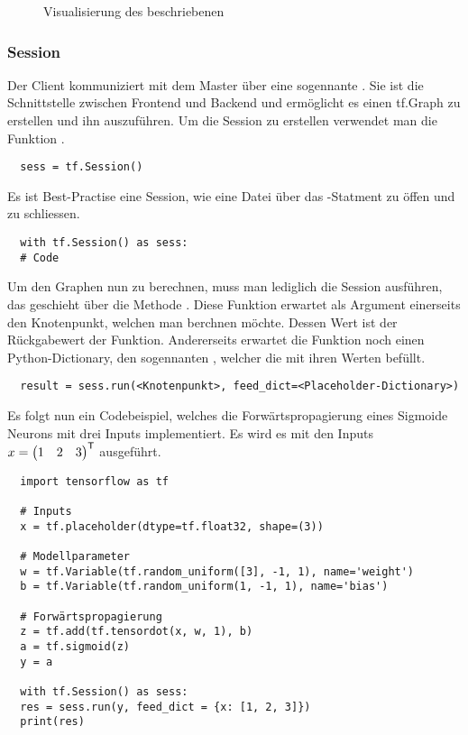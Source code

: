 \begin{figure}
  \caption{Visualisierung des beschriebenen }
\end{figure}
\para{}


\subsubsection{Session}
Der Client kommuniziert mit dem Master über eine sogennante
.
Sie ist die Schnittstelle zwischen Frontend und Backend und ermöglicht es einen tf.Graph
zu erstellen und ihn auszuführen.
Um die Session zu erstellen verwendet man die Funktion .
\begin{verbatim}
  sess = tf.Session()
\end{verbatim}
Es ist Best-Practise eine Session, wie eine Datei über das
-Statment zu öffen und zu schliessen.
\begin{verbatim}
  with tf.Session() as sess:
  # Code
\end{verbatim}
\para{}
Um den Graphen nun zu berechnen, muss man lediglich die Session ausführen, das
geschieht über die Methode .
Diese Funktion erwartet als Argument einerseits den Knotenpunkt, welchen man
berchnen möchte. Dessen Wert ist der Rückgabewert der Funktion.
Andererseits erwartet die Funktion noch einen Python-Dictionary, den sogennanten
, welcher die  mit ihren Werten befüllt.
\begin{verbatim}
  result = sess.run(<Knotenpunkt>, feed_dict=<Placeholder-Dictionary>)
\end{verbatim}
Es folgt nun ein Codebeispiel, welches die Forwärtspropagierung eines
Sigmoide Neurons mit drei Inputs implementiert. Es wird es mit den Inputs $x = \begin{pmatrix}1&2&3\end{pmatrix}^{\mathsf{T}}$ ausgeführt.
\begin{verbatim}
  import tensorflow as tf

  # Inputs
  x = tf.placeholder(dtype=tf.float32, shape=(3))

  # Modellparameter
  w = tf.Variable(tf.random_uniform([3], -1, 1), name='weight')
  b = tf.Variable(tf.random_uniform(1, -1, 1), name='bias')

  # Forwärtspropagierung
  z = tf.add(tf.tensordot(x, w, 1), b)
  a = tf.sigmoid(z)
  y = a

  with tf.Session() as sess:
  res = sess.run(y, feed_dict = {x: [1, 2, 3]})
  print(res)
\end{verbatim}

